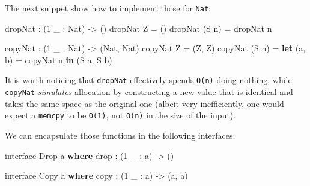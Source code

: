 \documentclass[
]{article}
\newenvironment{Shaded}{}{}
\newcommand{\DataTypeTok}[1]{\textcolor[rgb]{0.56,0.13,0.00}{#1}}
\newcommand{\DecValTok}[1]{\textcolor[rgb]{0.25,0.63,0.44}{#1}}
\newcommand{\FunctionTok}[1]{\textcolor[rgb]{0.02,0.16,0.49}{#1}}
\newcommand{\KeywordTok}[1]{\textcolor[rgb]{0.00,0.44,0.13}{\textbf{#1}}}
\newcommand{\NormalTok}[1]{#1}
\newcommand{\OperatorTok}[1]{\textcolor[rgb]{0.40,0.40,0.40}{#1}}
\newcommand{\OtherTok}[1]{\textcolor[rgb]{0.00,0.44,0.13}{#1}}
\begin{document}
The next snippet show how to implement those for \texttt{Nat}:

\begin{Shaded}
\begin{Highlighting}[]
\NormalTok{dropNat }\OperatorTok{:}\NormalTok{ (}\DecValTok{1}\NormalTok{ \_ }\OperatorTok{:} \DataTypeTok{Nat}\NormalTok{) }\OtherTok{{-}\textgreater{}}\NormalTok{ ()}
\NormalTok{dropNat }\DataTypeTok{Z} \OtherTok{=}\NormalTok{ ()}
\NormalTok{dropNat (}\DataTypeTok{S}\NormalTok{ n) }\OtherTok{=}\NormalTok{ dropNat n}

\NormalTok{copyNat }\OperatorTok{:}\NormalTok{ (}\DecValTok{1}\NormalTok{ \_ }\OperatorTok{:} \DataTypeTok{Nat}\NormalTok{) }\OtherTok{{-}\textgreater{}}\NormalTok{ (}\DataTypeTok{Nat}\NormalTok{, }\DataTypeTok{Nat}\NormalTok{)}
\NormalTok{copyNat }\DataTypeTok{Z} \OtherTok{=}\NormalTok{ (}\DataTypeTok{Z}\NormalTok{, }\DataTypeTok{Z}\NormalTok{)}
\NormalTok{copyNat (}\DataTypeTok{S}\NormalTok{ n) }\OtherTok{=} \KeywordTok{let}\NormalTok{ (a, b) }\OtherTok{=}\NormalTok{ copyNat n }\KeywordTok{in}
\NormalTok{                    (}\DataTypeTok{S}\NormalTok{ a, }\DataTypeTok{S}\NormalTok{ b)}
\end{Highlighting}
\end{Shaded}

It is worth noticing that \texttt{dropNat} effectively spends
\texttt{O(n)} doing nothing, while \texttt{copyNat} \emph{simulates}
allocation by constructing a new value that is identical and takes the
same space as the original one (albeit very inefficiently, one would
expect a \texttt{memcpy} to be \texttt{O(1)}, not \texttt{O(n)} in the
size of the input).

We can encapsulate those functions in the following interfaces:

\begin{Shaded}
\begin{Highlighting}[]
\NormalTok{interface }\DataTypeTok{Drop}\NormalTok{ a }\KeywordTok{where}
    \FunctionTok{drop} \OperatorTok{:}\NormalTok{ (}\DecValTok{1}\NormalTok{ \_ }\OperatorTok{:}\NormalTok{ a) }\OtherTok{{-}\textgreater{}}\NormalTok{ ()}

\NormalTok{interface }\DataTypeTok{Copy}\NormalTok{ a }\KeywordTok{where}
\NormalTok{    copy }\OperatorTok{:}\NormalTok{ (}\DecValTok{1}\NormalTok{ \_ }\OperatorTok{:}\NormalTok{ a) }\OtherTok{{-}\textgreater{}}\NormalTok{ (a, a)}
\end{Highlighting}
\end{Shaded}
\end{document}
